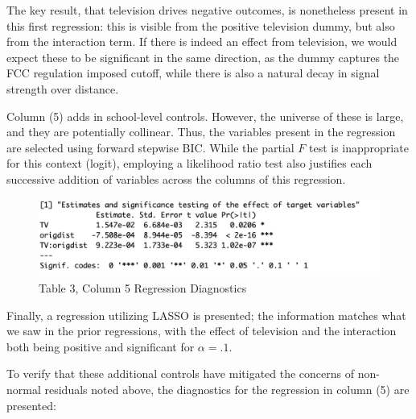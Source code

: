 \documentclass{article}
\begin{document}
The key result, that television drives negative outcomes, is nonetheless present in this first regression: this is visible from the positive television dummy, but also from the interaction term. If there is indeed an effect from television, we would expect these to be significant in the same direction, as the dummy captures the FCC regulation imposed cutoff, while there is also a natural decay in signal strength over distance.  

Column (5) adds in school-level controls. However, the universe of these is large, and they are potentially collinear.  Thus, the variables present in the regression are selected using forward stepwise BIC. While the partial $F$ test is inappropriate for this context (logit), employing a likelihood ratio test also justifies each successive addition of variables across the columns of this regression.
\clearpage

\begin{figure}[!hbtp]
\centering
\caption{Table 3, Column 5 Regression Diagnostics}
\includegraphics[width=12cm]{../explore/Output/regs/edu_OOSLasso}
\end{figure} 

Finally, a regression utilizing LASSO is presented; the information matches what we saw in the prior regressions, with the effect of television and the interaction both being positive and significant for $\alpha = .1$.

To verify that these additional controls have mitigated the concerns of non-normal residuals noted above, the diagnostics for the regression in column (5) are presented:
\end{document}
